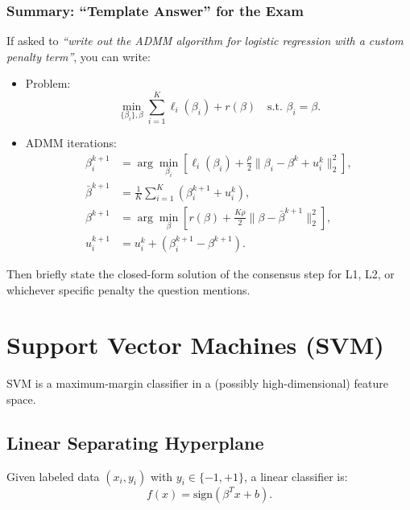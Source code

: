 \documentclass[11pt]{article}
\begin{document}
\subsubsection*{Summary: ``Template Answer'' for the Exam}

If asked to \emph{``write out the ADMM algorithm for logistic regression with a custom penalty term''}, you can write:

\begin{itemize}
    \item Problem:
    \[
        \min_{\{\beta_i\},\beta}
        \sum_{i=1}^K \ell_i(\beta_i) + r(\beta)
        \quad \text{s.t. } \beta_i = \beta.
    \]
    \item ADMM iterations:
    \begin{align*}
        \beta_i^{k+1}
        &= \arg\min_{\beta_i} \left[
            \ell_i(\beta_i)
            + \frac{\rho}{2}\|\beta_i - \beta^k + u_i^k\|_2^2
        \right], \\
        \bar{\beta}^{k+1} &= \frac{1}{K} \sum_{i=1}^K (\beta_i^{k+1} + u_i^k),\\
        \beta^{k+1}
        &= \arg\min_\beta \left[
            r(\beta) + \frac{K\rho}{2} \|\beta - \bar{\beta}^{k+1}\|_2^2
        \right], \\
        u_i^{k+1} &= u_i^k + \left(\beta_i^{k+1} - \beta^{k+1}\right).
    \end{align*}
\end{itemize}

Then briefly state the closed-form solution of the consensus step for L1, L2, or whichever specific penalty the question mentions.

\section{Support Vector Machines (SVM)}

SVM is a maximum-margin classifier in a (possibly high-dimensional) feature space.

\subsection{Linear Separating Hyperplane}

Given labeled data $(x_i, y_i)$ with $y_i \in \{-1, +1\}$, a linear classifier is:
\[
    f(x) = \text{sign}(\beta^T x + b).
\]
\end{document}
